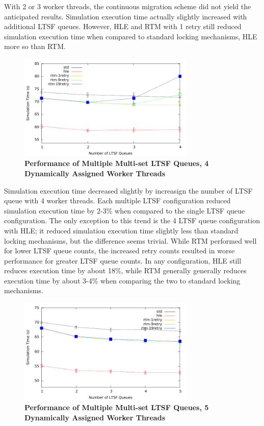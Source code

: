 \documentclass[11pt]{book}
\begin{document}
With 2 or 3 worker threads, the continuous migration scheme did not yield the
anticipated results.  Simulation execution time actually slightly increased with
additional LTSF queues.  However, HLE and RTM with 1 retry still reduced
simulation execution time when compared to standard locking mechanisms, HLE more so
than RTM.

\begin{figure}
    \centering
    \graphicspath{ {./figures/} }
    \includegraphics[width=0.75\textwidth,keepaspectratio]{hugeepidemicsim-CONTmig-timeVSschedQs-multiset-4thread}
    \caption{\textbf{Performance of Multiple Multi-set LTSF Queues, 4 Dynamically Assigned Worker Threads}}
    \label{fig:contThrMig_timeVSschq_4threads}
\end{figure}

Simulation execution time decreased slightly by increasign the number of LTSF
queue with 4 worker threads.  Each multiple LTSF configuration reduced
simulation execution time by 2-3\% when compared to the single LTSF queue
configuration.  The only exception to this trend is the 4 LTSF queue
configuration with HLE; it reduced simulation execution time slightly less than
standard locking mechanisms, but the difference seems trivial.  While RTM
performed well for lower LTSF queue counts, the increased retry counts resulted
in worse performance for greater LTSF queue counts.  In any configuration, HLE
still reduces execution time by about 18\%, while RTM generally generally
reduces execution time by about 3-4\% when comparing the two to standard locking
mechanisms.

\begin{figure}
    \centering
    \graphicspath{ {./figures/} }
    \includegraphics[width=0.75\textwidth,keepaspectratio]{hugeepidemicsim-CONTmig-timeVSschedQs-multiset-5thread}
    \caption{\textbf{Performance of Multiple Multi-set LTSF Queues, 5 Dynamically Assigned Worker Threads}}
    \label{fig:contThrMig_timeVSschq_5threads}
\end{figure}
\end{document}
